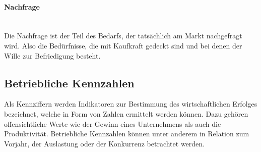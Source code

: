\paragraph{Nachfrage}~\\
Die Nachfrage ist der Teil des Bedarfs, der tatsächlich am Markt nachgefragt wird. Also die Bedürfnisse, die mit Kaufkraft gedeckt sind und bei denen der Wille zur Befriedigung besteht.
	

\subsection{Betriebliche Kennzahlen}

Als Kennziffern werden Indikatoren zur Bestimmung des wirtschaftlichen Erfolges bezeichnet, welche in Form von Zahlen ermittelt werden können. Dazu gehören offensichtliche Werte wie der Gewinn eines Unternehmens als auch die Produktivität. Betriebliche Kennzahlen können unter anderem in Relation zum Vorjahr, der Auslastung oder der Konkurrenz betrachtet werden.\\


